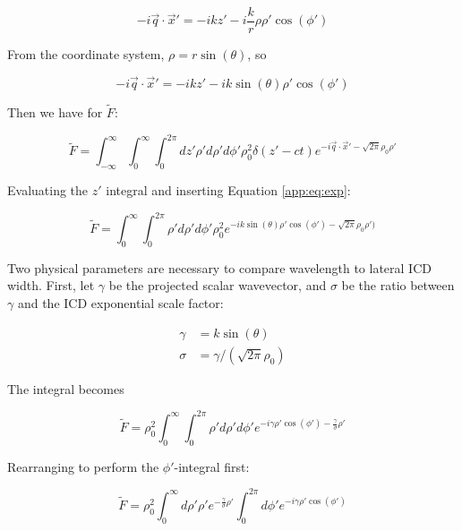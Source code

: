 \documentclass[amsmath,amssymb,aps,prd,10pt,twocolumn]{revtex4}
\begin{document}
\begin{equation}
-i \vec{q} \cdot \vec{x}' = -i k z'-i \frac{k}{r}\rho \rho' \cos(\phi')
\end{equation}

From the coordinate system, $\rho = r \sin(\theta)$, so

\begin{equation}
-i \vec{q} \cdot \vec{x}' = -i k z'-i k \sin(\theta) \rho' \cos(\phi') \label{app:eq:exp}
\end{equation}

Then we have for $\widetilde{F}$:

\begin{equation}
\widetilde{F} = \int_{-\infty}^{\infty} \int_{0}^{\infty} \int_{0}^{2\pi} dz' \rho' d\rho' d\phi' \rho_0^2 \delta(z' - ct) e^{-i \vec{q} \cdot \vec{x}' - \sqrt{2\pi}\rho_0 \rho'}
\end{equation}

Evaluating the $z'$ integral and inserting Equation \ref{app:eq:exp}:

\begin{equation}
\widetilde{F} = \int_{0}^{\infty} \int_{0}^{2\pi} \rho' d\rho' d\phi' \rho_0^2 e^{-i k\sin(\theta) \rho' \cos(\phi') - \sqrt{2\pi} \rho_0 \rho') }
\end{equation}

Two physical parameters are necessary to compare wavelength to lateral ICD width.  First, let $\gamma$ be the projected scalar wavevector, and $\sigma$ be the ratio between $\gamma$ and the ICD exponential scale factor:

\begin{align}
\gamma &= k \sin(\theta) \\
\sigma &= \gamma / (\sqrt{2\pi} \rho_0)
\end{align}

The integral becomes

\begin{equation}
\widetilde{F} = \rho_0^2 \int_{0}^{\infty} \int_{0}^{2\pi} \rho' d\rho' d\phi' e^{ -i\gamma \rho' \cos(\phi') - \frac{\gamma}{\sigma} \rho'}
\end{equation}

Rearranging to perform the $\phi'$-integral first:

\begin{equation}
\widetilde{F} = \rho_0^2 \int_0^{\infty} d\rho' \rho' e^{-\frac{\gamma}{\sigma}\rho'} \int_{0}^{2\pi} d\phi' e^{-i\gamma \rho' \cos(\phi')}
\end{equation}
\end{document}
